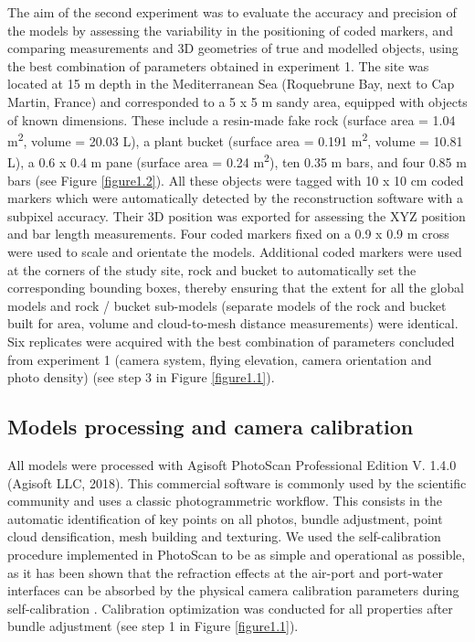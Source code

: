 The aim of the second experiment was to evaluate the accuracy and precision of the models by assessing the variability in the positioning of coded markers, and comparing measurements and 3D geometries of true and modelled objects, using the best combination of parameters obtained in experiment 1. The site was located at 15 m depth in the Mediterranean Sea (Roquebrune Bay, next to Cap Martin, France) and corresponded to a 5 x 5 m sandy area, equipped with objects of known dimensions. These include a resin-made fake rock (surface area = 1.04 m\textsuperscript{2}, volume = 20.03 L), a plant bucket (surface area = 0.191 m\textsuperscript{2}, volume = 10.81 L), a 0.6 x 0.4 m pane (surface area = 0.24 m\textsuperscript{2}), ten 0.35 m bars, and four 0.85 m bars (see Figure \ref{figure1.2}). All these objects were tagged with 10 x 10 cm coded markers which were automatically detected by the reconstruction software with a subpixel accuracy. Their 3D position was exported for assessing the XYZ position and bar length measurements. Four coded markers fixed on a 0.9 x 0.9 m cross were used to scale and orientate the models. Additional coded markers were used at the corners of the study site, rock and bucket to automatically set the corresponding bounding boxes, thereby ensuring that the extent for all the global models and rock / bucket sub-models (separate models of the rock and bucket built for area, volume and cloud-to-mesh distance measurements) were identical. Six replicates were acquired with the best combination of parameters concluded from experiment 1 (camera system, flying elevation, camera orientation and photo density) (see step 3 in Figure \ref{figure1.1}).

\subsection{Models processing and camera calibration}\label{chapitre1_2.2}
All models were processed with Agisoft PhotoScan Professional Edition V. 1.4.0 (Agisoft LLC, 2018). This commercial software is commonly used by the scientific community \citep{figueira_accuracy_2015, mizuno_simple_2017, guo_accuracy_2016, burns_utilizing_2015, burns_integrating_2015, burns_assessing_2016, casella_mapping_2017} and uses a classic photogrammetric workflow. This consists in the automatic identification of key points on all photos, bundle adjustment, point cloud densification, mesh building and texturing. We used the self-calibration procedure implemented in PhotoScan to be as simple and operational as possible, as it has been shown that the refraction effects at the air-port and port-water interfaces can be absorbed by the physical camera calibration parameters during self-calibration \citep{shortis_calibration_2015}. Calibration optimization was conducted for all properties after bundle adjustment (see step 1 in Figure \ref{figure1.1}).


